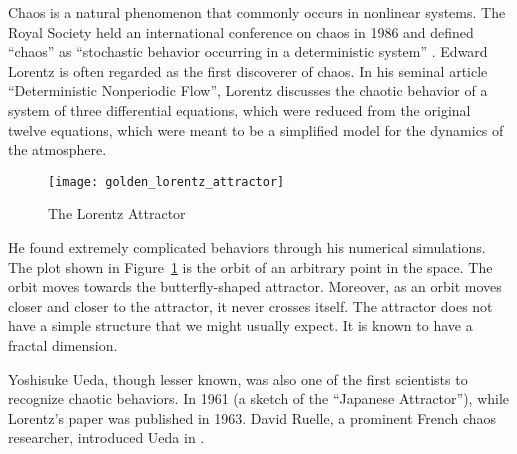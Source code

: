 \documentclass[10pt,twoside,draft]{book}
\begin{document}
Chaos is a natural phenomenon that commonly occurs in nonlinear systems.
The Royal Society held an international conference on chaos in 1986 and defined ``chaos'' as ``stochastic behavior occurring in a deterministic system'' \citep{stewart}.
Edward Lorentz is often regarded as the first discoverer of chaos.
In his seminal article ``Deterministic Nonperiodic Flow'', Lorentz discusses the chaotic behavior of a system of three differential equations, which were reduced from the original twelve equations, which were meant to be a simplified model for the dynamics of the atmosphere.
\begin{figure}[ht]
  \centering
  \texttt{[image: golden\_lorentz\_attractor]}
  \caption{The Lorentz Attractor}
  \label{fig:lorentz}
\end{figure}
He found extremely complicated behaviors through his numerical simulations.
The plot shown in Figure~\ref{fig:lorentz} is the orbit of an arbitrary point in the space.
The orbit moves towards the butterfly-shaped attractor.
Moreover, as an orbit moves closer and closer to the attractor, it never crosses itself.
The attractor does not have a simple structure that we might usually expect.
It is known to have a fractal dimension.

Yoshisuke Ueda, though lesser known, was also one of the first scientists to recognize chaotic behaviors.
In 1961 (a sketch of the ``Japanese Attractor''), while Lorentz's paper was published in 1963.
David Ruelle, a prominent French chaos researcher, introduced Ueda in \citep{ruelle}.
\end{document}
